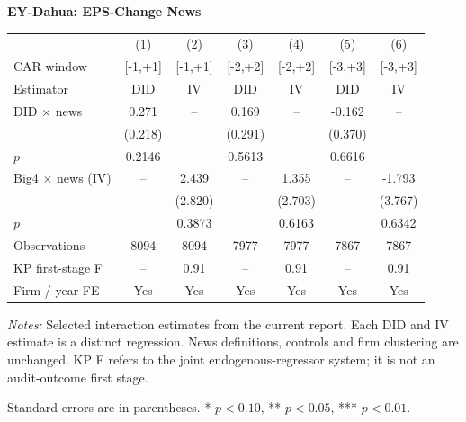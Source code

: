 \documentclass[10pt]{article}
\begin{document}
\begin{minipage}{23.60cm}
\fontsize{10}{12}\selectfont
\setlength{\tabcolsep}{4pt}\renewcommand{\arraystretch}{1.08}
{\large\bfseries EY-Dahua: EPS-Change News}\par\medskip
\begin{tabular*}{\linewidth}{@{\extracolsep{\fill}}lcccccc@{}}
\toprule
 & (1) & (2) & (3) & (4) & (5) & (6) \\
CAR window & [-1,+1] & [-1,+1] & [-2,+2] & [-2,+2] & [-3,+3] & [-3,+3] \\
Estimator & DID & IV & DID & IV & DID & IV \\
\midrule
DID $\times$ news & 0.271 & -- & 0.169 & -- & -0.162 & -- \\
 & (0.218) &  & (0.291) &  & (0.370) &  \\
$p$ & 0.2146 &  & 0.5613 &  & 0.6616 &  \\
Big4 $\times$ news (IV) & -- & 2.439 & -- & 1.355 & -- & -1.793 \\
 &  & (2.820) &  & (2.703) &  & (3.767) \\
$p$ &  & 0.3873 &  & 0.6163 &  & 0.6342 \\
\midrule
Observations & 8094 & 8094 & 7977 & 7977 & 7867 & 7867 \\
KP first-stage F & -- & 0.91 & -- & 0.91 & -- & 0.91 \\
Firm / year FE & Yes & Yes & Yes & Yes & Yes & Yes \\
\bottomrule\end{tabular*}\par\medskip
\fontsize{9}{11}\selectfont\textit{Notes:} Selected interaction estimates from the current report. Each DID and IV estimate is a distinct regression. News definitions, controls and firm clustering are unchanged. KP F refers to the joint endogenous-regressor system; it is not an audit-outcome first stage.
\par Standard errors are in parentheses. * $p<0.10$, ** $p<0.05$, *** $p<0.01$.
\end{minipage}
\end{document}
